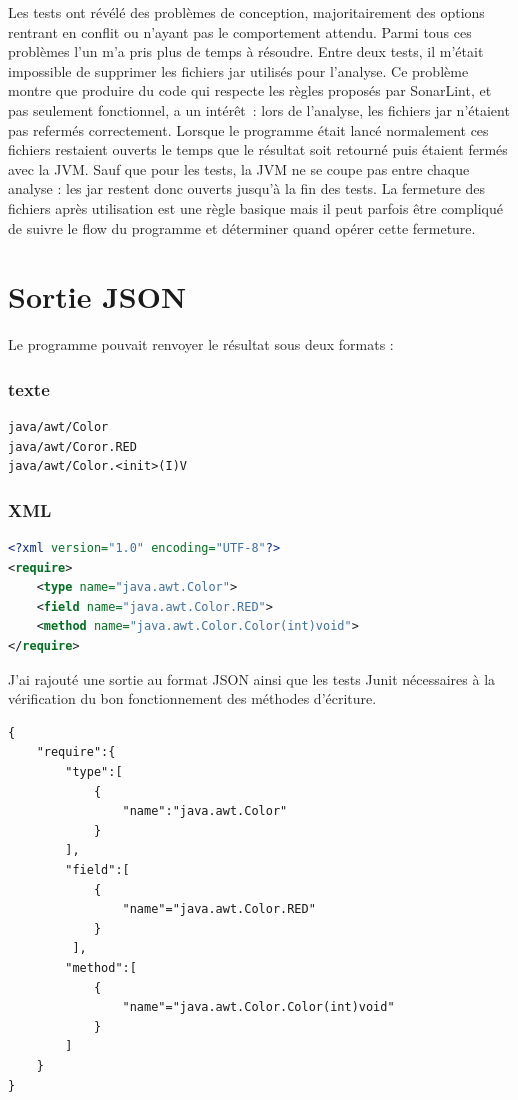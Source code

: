 \documentclass[french,a4paper,12pt]{report}
\begin{document}
Les tests ont révélé des problèmes de conception, majoritairement des options rentrant en conflit ou n’ayant pas le comportement attendu. Parmi tous ces problèmes l'un m’a pris plus de temps à résoudre. Entre deux tests, il m’était impossible de supprimer les fichiers jar utilisés pour l’analyse. Ce problème montre que produire du code qui respecte les règles proposés par SonarLint, et pas seulement fonctionnel, a un intérêt : 
lors de l'analyse, les fichiers jar n'étaient pas refermés correctement. Lorsque le programme était lancé normalement ces fichiers restaient ouverts le temps que le résultat soit retourné puis étaient fermés avec la JVM. Sauf que pour les tests, la JVM ne se coupe pas entre chaque analyse : les jar restent donc ouverts jusqu’à la fin des tests. 
La fermeture des fichiers après utilisation est une règle basique mais il peut parfois être compliqué de suivre le flow du programme et déterminer quand opérer cette fermeture.

\section{Sortie JSON}

Le programme pouvait renvoyer le résultat sous deux formats :

\subsubsection{texte}

\begin{lstlisting}
java/awt/Color
java/awt/Coror.RED
java/awt/Color.<init>(I)V
\end{lstlisting}

\subsubsection{XML}

\begin{lstlisting}[language=xml]
<?xml version="1.0" encoding="UTF-8"?>
<require>
	<type name="java.awt.Color">
	<field name="java.awt.Color.RED">
	<method name="java.awt.Color.Color(int)void">
</require>
\end{lstlisting}



J'ai rajouté une sortie au format JSON ainsi que les tests Junit nécessaires à la vérification du bon fonctionnement des méthodes d'écriture.

\begin{lstlisting}
{
	"require":{
		"type":[ 
			{
				"name":"java.awt.Color"
			}
		],
		"field":[
			{
		 		"name"="java.awt.Color.RED"
		 	}
		 ],
		"method":[
			{
				"name"="java.awt.Color.Color(int)void"
			}
		]
	}
}
\end{lstlisting}
\end{document}
